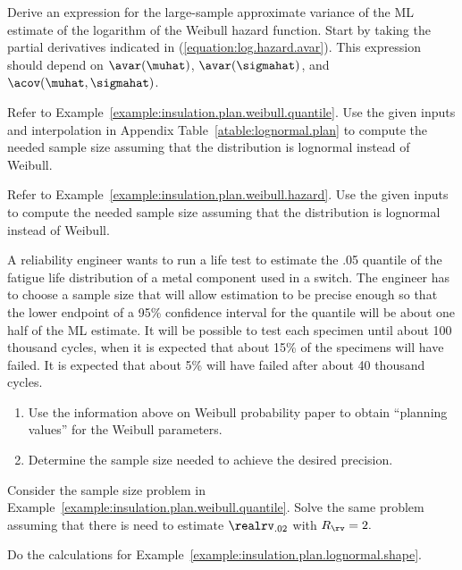 \begin{exercise1}
Derive an expression for the large-sample approximate variance of
the ML estimate of the logarithm of the Weibull hazard
function. Start by taking the partial derivatives indicated in
(\ref{equation:log.hazard.avar}). This expression should depend on
$\avar(\muhat)$, $\avar(\sigmahat)$, and $
\acov(\muhat,\sigmahat)$.
\end{exercise1}

\begin{exercise}
Refer to Example~\ref{example:insulation.plan.weibull.quantile}.  Use
the given inputs and interpolation in Appendix
Table~\ref{atable:lognormal.plan}
to compute the needed sample size assuming that the
distribution is lognormal instead of Weibull.
\end{exercise}

\begin{exercise}
Refer to Example~\ref{example:insulation.plan.weibull.hazard}.  Use
the given inputs to compute the needed sample size assuming that the
distribution is lognormal instead of Weibull.
\end{exercise}

\begin{exercise}
A reliability engineer wants to run a life test to
estimate the .05 quantile of the fatigue life distribution of a metal
component used in a switch. The engineer has to choose a sample size that
will allow estimation to be precise enough so that the lower endpoint
of a 95\% confidence interval for the quantile will be about one half
of the ML estimate. It will be possible to test each specimen until
about 100 thousand cycles, when it is expected that about 15\% of the
specimens will have failed. It is expected that about 5\% will have
failed after about 40 thousand cycles.
\begin{enumerate}
\item
Use the information above on Weibull probability
paper to obtain ``planning values'' for the Weibull parameters.
\item
Determine the sample size needed to achieve the desired precision.
\end{enumerate}
\end{exercise}

\begin{exercise}
Consider the sample size problem in
Example~\ref{example:insulation.plan.weibull.quantile}.  Solve the
same problem assuming that there is need to estimate $\realrv_{.02}$
with $R_{\rv}=2.$
\end{exercise}
\begin{exercise}
Do the calculations for Example~\ref{example:insulation.plan.lognormal.shape}.
\end{exercise}


